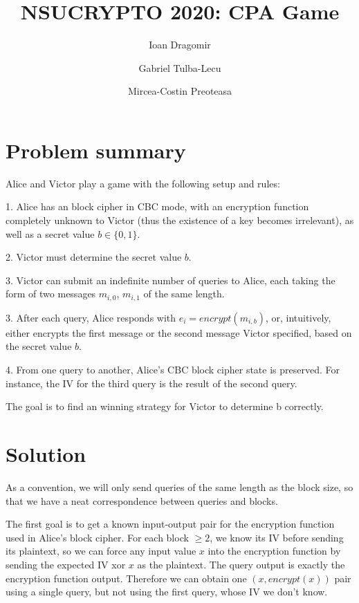 \documentclass[11pt]{llncs}
\title{NSUCRYPTO 2020: CPA Game}
\author{
	Ioan Dragomir\inst{1} \and
	Gabriel Tulba-Lecu\inst{2} \and
	Mircea-Costin Preoteasa\inst{3}
}
\institute{
	\email{ioandr@gomir.pw} \textendash \ Technical University of Cluj-Napoca \and
	\email{gabi\_tulba\_lecu@yahoo.com} \textendash \ Polytechnic Univeristy of Bucharest \and
	\email{mircea\_costin84@yahoo.com} \textendash \ Polytechnic Univeristy of Bucharest
}
\begin{document}
\let\oldaddcontentsline\addcontentsline
\def\addcontentsline#1#2#3{}
\maketitle
\def\addcontentsline#1#2#3{\oldaddcontentsline{#1}{#2}{#3}}


\let\oldnewpage\newpage
\def\newpage{\hfill}
\setcounter{tocdepth}{3}
\tableofcontents
\def\newpage{\oldnewpage}

\section{Problem summary}

Alice and Victor play a game with the following setup and rules:

1. Alice has an block cipher in CBC mode, with an encryption function completely unknown to Victor (thus the existence of a key becomes irrelevant), as well as a secret value $b \in \{0, 1\}$.

2. Victor must determine the secret value $b$.

3. Victor can submit an indefinite number of queries to Alice, each taking the form of two messages $m_{i,0}$, $m_{i,1}$ of the same length.

3. After each query, Alice responds with $e_i = encrypt(m_{i,b})$, or, intuitively, either encrypts the first message or the second message Victor specified, based on the secret value $b$.

4. From one query to another, Alice's CBC block cipher state is preserved. For instance, the IV for the third query is the result of the second query.

The goal is to find an winning strategy for Victor to determine b correctly.

\section{Solution}

As a convention, we will only send queries of the same length as the block size, so that we have a neat correspondence between queries and blocks.

The first goal is to get a known input-output pair for the encryption function used in Alice's block cipher. For each block $\geq 2$, we know its IV before sending its plaintext, so we can force any input value $x$ into the encryption function by sending the expected IV xor $x$ as the plaintext. The query output is exactly the encryption function output. Therefore we can obtain one $(x, encrypt(x))$ pair using a single query, but not using the first query, whose IV we don't know.
\end{document}

